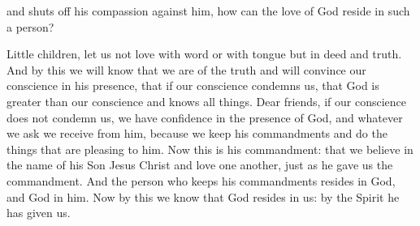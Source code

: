{and
shuts off
his
compassion
against
him,
how
can
the love
of God
reside
in
such a person?
\par }{\PP {}Little children,
let us
not
love
with word
or
with tongue
but
in
deed
and
truth.
And by
this
we will know
that
we are
of
the truth
and
will convince
our
conscience
in
his
presence,
that
if
our
conscience
condemns
us, that
God
is
greater than
our
conscience
and
knows
all things.
Dear friends,
if
our conscience
does not
condemn
us, we have
confidence
in the presence of
God,
and
whatever
we ask
we receive
from
him,
because
we keep
his
commandments
and
do
the things that are pleasing
to
him.
Now
this
is
his
commandment: that
we believe
in the name
of his
Son
Jesus
Christ
and
love
one another,
just as
he gave
us
the commandment.
And
the person who keeps
his
commandments
resides
in
God,
and
God
in
him.
Now
by
this
we know
that
God resides
in
us: by
the Spirit
he has given
us.

}
